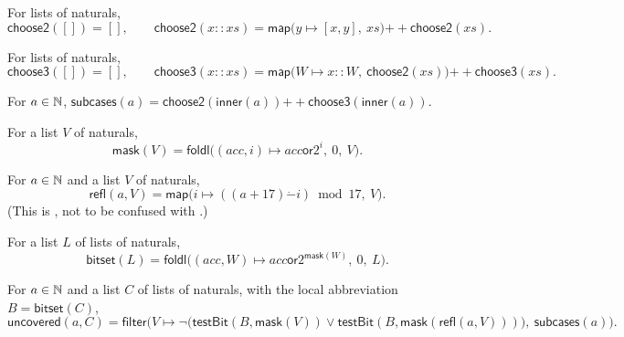 \begin{definition}\label{cb:def:choose2}
For lists of naturals,
\[
\mathsf{choose2}([])=[],\qquad
\mathsf{choose2}(x\mathbin{::}xs)=\mathsf{map}\big(y\mapsto[x,y],\ xs\big)\mathbin{+\!\!+}\mathsf{choose2}(xs).
\]
\end{definition}

\begin{definition}\label{cb:def:choose3}
For lists of naturals,
\[
\mathsf{choose3}([])=[],\qquad
\mathsf{choose3}(x\mathbin{::}xs)=\mathsf{map}\big(W\mapsto x\mathbin{::}W,\ \mathsf{choose2}(xs)\big)
\mathbin{+\!\!+}\mathsf{choose3}(xs).
\]
\end{definition}

\begin{definition}\label{cb:def:subcases}
For $a\in\mathbb N$, $\mathsf{subcases}(a)=\mathsf{choose2}(\mathsf{inner}(a))\mathbin{+\!\!+}\mathsf{choose3}(\mathsf{inner}(a))$.
\end{definition}

\begin{definition}\label{cb:def:mask}
For a list $V$ of naturals,
\[
\mathsf{mask}(V)=\mathsf{foldl}\big((acc,i)\mapsto acc\mathbin{\mathsf{or}}2^i,\ 0,\ V\big).
\]
\end{definition}

\begin{definition}\label{cb:def:c2refl}
For $a\in\mathbb N$ and a list $V$ of naturals,
\[
\mathsf{refl}(a,V)=\mathsf{map}\big(i\mapsto((a+17)\mathbin{\dot-}i)\bmod17,\ V\big).
\]
(This is , not to be confused with .)
\end{definition}

\begin{definition}\label{cb:def:bitset}
For a list $L$ of lists of naturals,
\[
\mathsf{bitset}(L)=\mathsf{foldl}\big((acc,W)\mapsto acc\mathbin{\mathsf{or}}2^{\mathsf{mask}(W)},\ 0,\ L\big).
\]
\end{definition}

\begin{definition}\label{cb:def:uncovered}
For $a\in\mathbb N$ and a list $C$ of lists of naturals, with the local abbreviation $B=\mathsf{bitset}(C)$,
\[
\mathsf{uncovered}(a,C)=\mathsf{filter}\Big(V\mapsto\neg\big(\mathsf{testBit}(B,\mathsf{mask}(V))\vee
\mathsf{testBit}(B,\mathsf{mask}(\mathsf{refl}(a,V)))\big),\ \mathsf{subcases}(a)\Big).
\]
\end{definition}


